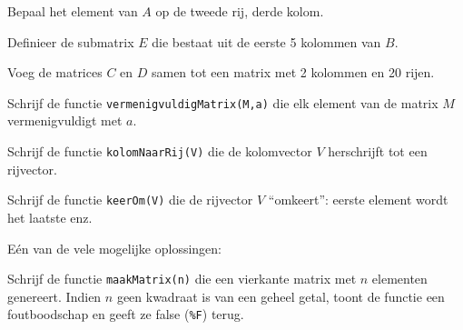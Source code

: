 \begin{oef}
Bepaal het element van $A$ op de tweede rij, derde kolom.
\begin{opl}
\end{opl}
\end{oef}

\begin{oef}
Definieer de submatrix $E$ die bestaat uit de eerste 5 kolommen van $B$.
\begin{opl}
\end{opl}
\end{oef}

\begin{oef}
Voeg de matrices $C$ en $D$ samen tot een matrix met 2 kolommen en 20 rijen.
\begin{opl}
\end{opl}
\end{oef}

\begin{oef}
Schrijf de functie \texttt{vermenigvuldigMatrix(M,a)} die elk element van de matrix $M$ vermenigvuldigt met $a$.
\begin{opl}
\end{opl}
\end{oef}

\begin{oef}
Schrijf de functie \texttt{kolomNaarRij(V)} die de kolomvector $V$ herschrijft tot een rijvector.
\begin{opl}
\end{opl}
\end{oef}

\begin{oef}
Schrijf de functie \texttt{keerOm(V)} die de rijvector $V$ ``omkeert'': eerste element wordt het laatste enz.
\begin{opl}
E\'en van de vele mogelijke oplossingen:
\end{opl}
\end{oef}

\begin{oef}
Schrijf de functie \texttt{maakMatrix(n)} die een vierkante matrix met $n$ elementen genereert.
Indien $n$ geen kwadraat is van een geheel getal, toont de functie een foutboodschap en geeft ze {\sc false} (\texttt{\%F}) terug.
\end{oef}
   
